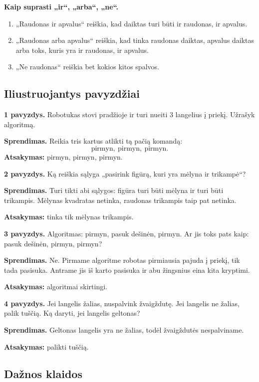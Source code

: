 \textbf{Kaip suprasti „ir“, „arba“, „ne“.}
\begin{enumerate}
\item „Raudonas ir apvalus“ reiškia, kad daiktas turi būti ir raudonas, ir apvalus.
\item „Raudonas arba apvalus“ reiškia, kad tinka raudonas daiktas, apvalus daiktas arba toks, kuris yra ir raudonas, ir apvalus.
\item „Ne raudonas“ reiškia bet kokios kitos spalvos.
\end{enumerate}

\subsection{Iliustruojantys pavyzdžiai}

\textbf{1 pavyzdys.} Robotukas stovi pradžioje ir turi nueiti \(3\) langelius į priekį. Užrašyk algoritmą.

\textbf{Sprendimas.} Reikia tris kartus atlikti tą pačią komandą:
\[
\text{pirmyn},\ \text{pirmyn},\ \text{pirmyn}.
\]
\textbf{Atsakymas:} pirmyn, pirmyn, pirmyn.

\textbf{2 pavyzdys.} Ką reiškia sąlyga „pasirink figūrą, kuri yra mėlyna ir trikampė“?

\textbf{Sprendimas.} Turi tikti abi sąlygos: figūra turi būti mėlyna ir turi būti trikampis. Mėlynas kvadratas netinka, raudonas trikampis taip pat netinka.

\textbf{Atsakymas:} tinka tik mėlynas trikampis.

\textbf{3 pavyzdys.} Algoritmas: pirmyn, pasuk dešinėn, pirmyn. Ar jis toks pats kaip: pasuk dešinėn, pirmyn, pirmyn?

\textbf{Sprendimas.} Ne. Pirmame algoritme robotas pirmiausia pajuda į priekį, tik tada pasisuka. Antrame jis iš karto pasisuka ir abu žingsnius eina kita kryptimi.

\textbf{Atsakymas:} algoritmai skirtingi.

\textbf{4 pavyzdys.} Jei langelis žalias, nuspalvink žvaigždutę. Jei langelis ne žalias, palik tuščią. Ką daryti, jei langelis geltonas?

\textbf{Sprendimas.} Geltonas langelis yra ne žalias, todėl žvaigždutės nespalviname.

\textbf{Atsakymas:} palikti tuščią.

\subsection{Dažnos klaidos}

